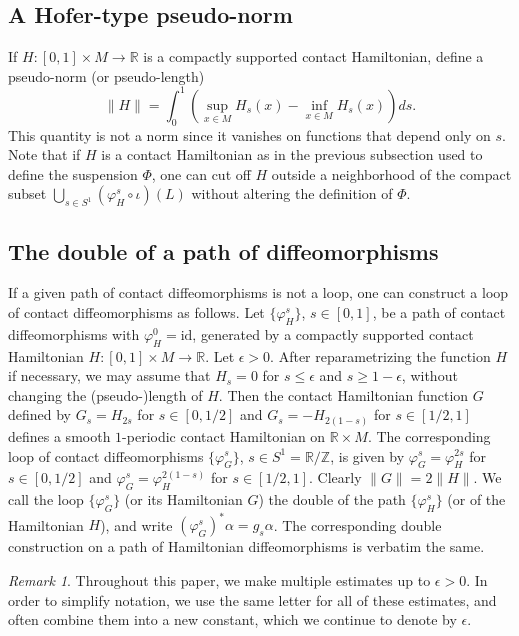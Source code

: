\documentclass{amsart}
\theoremstyle{remark}
\newtheorem{rmk}[thm]{Remark}
\def\id{{\textrm{id}}}
\def\R{{\mathbb R}}
\def\Z{{\mathbb Z}}
\begin{document}
\subsection{A Hofer-type pseudo-norm}
If $H \colon [0, 1] \times M \to \R$ is a compactly supported contact Hamiltonian, define a pseudo-norm (or pseudo-length)
\[ \| H \| = \int_0^1 \left( \sup_{x \in M} H_s (x) - \inf_{x \in M} H_s (x) \right) ds . \]
This quantity is not a norm since it vanishes on functions that depend only on $s$.
Note that if $H$ is a contact Hamiltonian as in the previous subsection used to define the suspension $\Phi$, one can cut off $H$ outside a neighborhood of the compact subset $\bigcup_{s \in S^1} (\varphi_H^s \circ \iota) (L)$ without altering the definition of $\Phi$.

\subsection{The double of a path of diffeomorphisms}
If a given path of contact diffeomorphisms is not a loop, one can construct a loop of contact diffeomorphisms as follows.
Let $\{ \varphi_H^s \}$, $s \in [0, 1]$, be a path of contact diffeomorphisms with $\varphi_H^0 = \id$, generated by a compactly supported contact Hamiltonian $H \colon [0, 1] \times M \to \R$.
Let $\epsilon > 0$.
After reparametrizing the function $H$ if necessary, we may assume that $H_s = 0$ for $s \le \epsilon$ and $s \ge 1 - \epsilon$, without changing the (pseudo-)length of $H$.
Then the contact Hamiltonian function $G$ defined by $G_s = H_{2 s}$ for $s \in [0, 1 / 2]$ and $G_s = - H_{2 (1 - s)}$ for $s \in [1 / 2, 1]$ defines a smooth $1$-periodic contact Hamiltonian on $\R \times M$.
The corresponding loop of contact diffeomorphisms $\{ \varphi_G^s \}$, $s \in S^1 = \R / \Z$, is given by $\varphi_G^s = \varphi_H^{2 s}$ for $s \in [0, 1 / 2]$ and $\varphi_G^s = \varphi_H^{2 (1 - s)}$ for $s \in [1 / 2, 1]$.
Clearly $\| G \| = 2 \| H \|$.
We call the loop $\{ \varphi_G^s \}$ (or its Hamiltonian $G$) the double of the path $\{ \varphi_H^s \}$ (or of the Hamiltonian $H$), and write $(\varphi_G^s)^* \alpha = g_s \alpha$.
The corresponding double construction on a path of Hamiltonian diffeomorphisms is verbatim the same.

\begin{rmk}
Throughout this paper, we make multiple estimates up to $\epsilon > 0$.
In order to simplify notation, we use the same letter for all of these estimates, and often combine them into a new constant, which we continue to denote by $\epsilon$.
\end{rmk}
\end{document}
